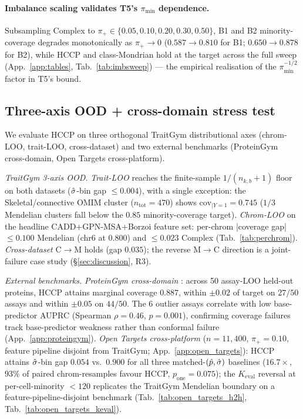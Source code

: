 \paragraph{Imbalance scaling validates T5's $\pi_{\min}$ dependence.}
Subsampling Complex to $\pi_{+} \in \{0.05, 0.10, 0.20, 0.30, 0.50\}$, B1 and B2 minority-coverage degrades monotonically as $\pi_{+} \to 0$ ($0.587 \to 0.810$ for B1; $0.650 \to 0.878$ for B2), while HCCP and class-Mondrian hold at the target across the full sweep (App.~\ref{app:tables}, Tab.~\ref{tab:imbsweep}) — the empirical realisation of the $\pi_{\min}^{-1/2}$ factor in T5's bound.

\subsection{Three-axis OOD + cross-domain stress test}
\label{sec:experiments:ood}

We evaluate HCCP on three orthogonal TraitGym distributional axes (chrom-LOO, trait-LOO, cross-dataset) and two external benchmarks (ProteinGym cross-domain, Open Targets cross-platform).

\emph{TraitGym 3-axis OOD.} \emph{Trait-LOO} reaches the finite-sample $1/(n_{k,b}+1)$ floor on both datasets ($\hat{\sigma}$-bin gap $\leq 0.004$), with a single exception: the Skeletal/connective OMIM cluster ($n_{\mathrm{tot}} = 470$) shows $\mathrm{cov}_{|Y=1} = 0.745$ ($1/3$ Mendelian clusters fall below the $0.85$ minority-coverage target). \emph{Chrom-LOO} on the headline CADD+GPN-MSA+Borzoi feature set: per-chrom |coverage gap| $\leq 0.100$ Mendelian (chr6 at $0.800$) and $\leq 0.023$ Complex (Tab.~\ref{tab:perchrom}). \emph{Cross-dataset} C$\to$M holds (gap $0.035$); the reverse M$\to$C direction is a joint-failure case study (§\ref{sec:discussion}, R3).

\emph{External benchmarks.} \emph{ProteinGym cross-domain} \citep{notin2023proteingym}: across 50 assay-LOO held-out proteins, HCCP attains marginal coverage $0.887$, within $\pm 0.02$ of target on $27/50$ assays and within $\pm 0.05$ on $44/50$. The $6$ outlier assays correlate with low base-predictor AUPRC (Spearman $\rho = 0.46$, $p = 0.001$), confirming coverage failures track base-predictor weakness rather than conformal failure (App.~\ref{app:proteingym}). \emph{Open Targets cross-platform} ($n = 11{,}400$, $\pi_{+} = 0.10$, feature pipeline disjoint from TraitGym; App.~\ref{app:open_targets}): HCCP attains $\hat{\sigma}$-bin gap $0.054$ vs.\ $0.900$ for all three matched-$(\hat{p}, \hat{\sigma})$ baselines ($16.7\times$, $93\%$ of paired chrom-resamples favour HCCP, $p_{\mathrm{one}} = 0.075$); the $K_{\mathrm{eval}}$ reversal at per-cell-minority $< 120$ replicates the TraitGym Mendelian boundary on a feature-pipeline-disjoint benchmark (Tab.~\ref{tab:open_targets_h2h}, Tab.~\ref{tab:open_targets_keval}).

